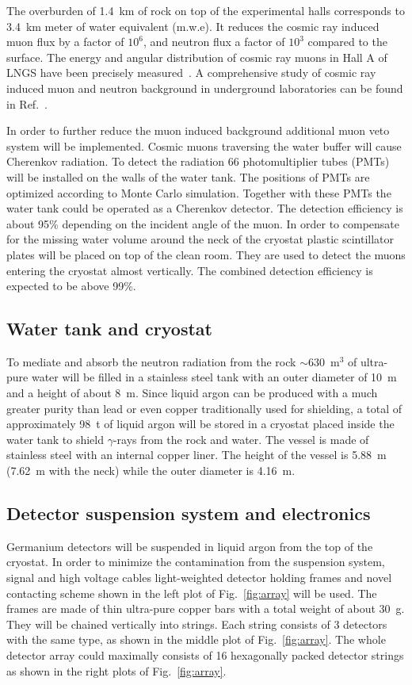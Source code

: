 The overburden of 1.4~km of rock on top of the experimental halls corresponds to 3.4~km meter of water equivalent (m.w.e). It reduces the cosmic ray induced muon flux by a factor of $10^{6}$, and neutron flux a factor of $10^{3}$ compared to the surface. The energy and angular distribution of cosmic ray muons in Hall A of LNGS have been precisely measured~\cite{Amb95, Lip91, Amb03}. A comprehensive study of cosmic ray induced muon and neutron background in underground laboratories can be found in Ref.~\cite{Mei06}.

In order to further reduce the muon induced background additional muon veto system will be implemented. Cosmic muons traversing the water buffer will cause Cherenkov radiation. To detect the radiation 66 photomultiplier tubes (PMTs) will be installed on the walls of the water tank. The positions of PMTs are optimized according to Monte Carlo simulation. Together with these PMTs the water tank could be operated as a Cherenkov detector. The detection efficiency is about 95\% depending on the incident angle of the muon. In order to compensate for the missing water volume around the neck of the cryostat plastic scintillator plates will be placed on top of the clean room. They are used to detect the muons entering the cryostat almost vertically. The combined detection efficiency is expected to be above 99\%.

\subsection{Water tank and cryostat}
\label{sec:gerda:rock}
To mediate and absorb the neutron radiation from the rock $\sim 630$~m$^{3}$ of ultra-pure water will be filled in a stainless steel tank with an outer diameter of 10~m and a height of about 8~m. Since liquid argon can be produced with a much greater purity than lead or even copper traditionally used for shielding, a total of approximately 98~t of liquid argon will be stored in a cryostat placed inside the water tank to shield $\gamma$-rays from the rock and water. The vessel is made of stainless steel with an internal copper liner. The height of the vessel is 5.88~m (7.62~m with the neck) while the outer diameter is 4.16~m.

\subsection{Detector suspension system and electronics}
\label{sec:gerda:cable}
Germanium detectors will be suspended in liquid argon from the top of the cryostat. In order to minimize the contamination from the suspension system, signal and high voltage cables light-weighted detector holding frames and novel contacting scheme shown in the left plot of Fig.~\ref{fig:array} will be used. The frames are made of thin ultra-pure copper bars with a total weight of about 30~g. They will be chained vertically into strings. Each string consists of 3 detectors with the same type, as shown in the middle plot of Fig.~\ref{fig:array}. The whole detector array could maximally consists of 16 hexagonally packed detector strings as shown in the right plots of Fig.~\ref{fig:array}. 

